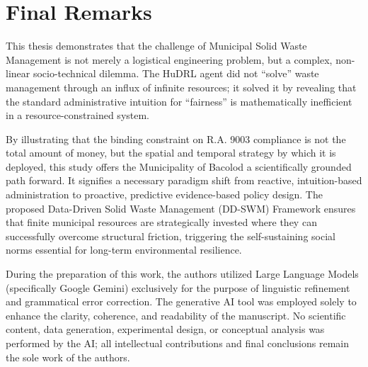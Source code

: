 \section{Final Remarks}

This thesis demonstrates that the challenge of Municipal Solid Waste Management is not merely a logistical engineering problem, but a complex, non-linear socio-technical dilemma. The HuDRL agent did not ``solve'' waste management through an influx of infinite resources; it solved it by revealing that the standard administrative intuition for ``fairness'' is mathematically inefficient in a resource-constrained system.

By illustrating that the binding constraint on R.A. 9003 compliance is not the total amount of money, but the spatial and temporal strategy by which it is deployed, this study offers the Municipality of Bacolod a scientifically grounded path forward. It signifies a necessary paradigm shift from reactive, intuition-based administration to proactive, predictive evidence-based policy design. The proposed Data-Driven Solid Waste Management (DD-SWM) Framework ensures that finite municipal resources are strategically invested where they can successfully overcome structural friction, triggering the self-sustaining social norms essential for long-term environmental resilience.


During the preparation of this work, the authors utilized Large Language Models (specifically Google Gemini) exclusively for the purpose of linguistic refinement and grammatical error correction. The generative AI tool was employed solely to enhance the clarity, coherence, and readability of the manuscript. No scientific content, data generation, experimental design, or conceptual analysis was performed by the AI; all intellectual contributions and final conclusions remain the sole work of the authors.